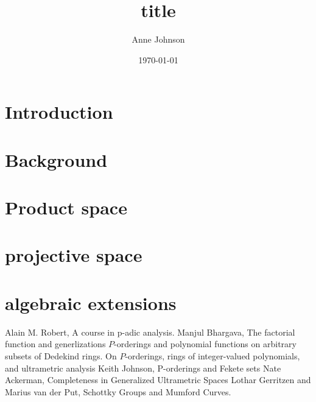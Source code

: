 \documentclass[12pt]{report}
\title{title}
\author{Anne Johnson}
\date{\today}
\theoremstyle{definition}
\begin{document}



\chapter*{Introduction}

\chapter*{Background}

\chapter*{Product space}

\chapter*{projective space}

\chapter*{algebraic extensions}



%
%

%	
\begin{thebibliography}{1}
 Alain M. Robert, A course in p-adic analysis.
 Manjul Bhargava, The factorial function and generlizations
 $P$-orderings and polynomial functions on arbitrary subsets of Dedekind rings.
 On $ P$-orderings, rings of integer-valued polynomials, and ultrametric analysis
 Keith Johnson, P-orderings and Fekete sets
 Nate Ackerman,  Completeness in Generalized Ultrametric Spaces
 Lothar Gerritzen and Marius van der Put, Schottky Groups and Mumford Curves.
\end{thebibliography}
\end{document}
